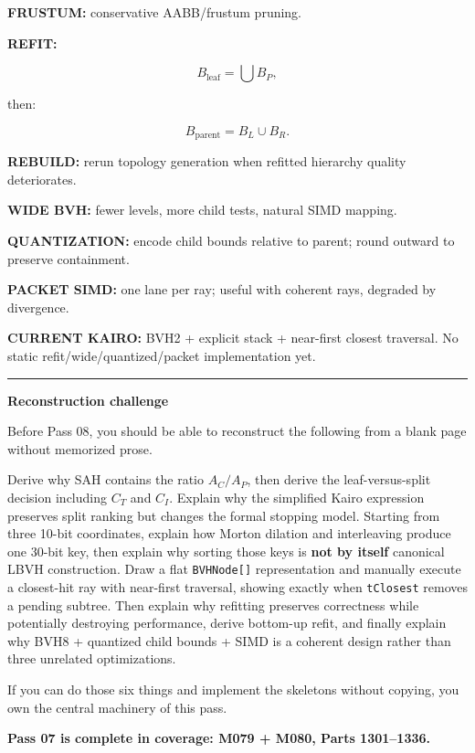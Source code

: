 \textbf{FRUSTUM:} conservative AABB/frustum pruning.

\textbf{REFIT:}

\[
B_{\text{leaf}}
=
\bigcup B_P,
\]

then:

\[
B_{\text{parent}}
=
B_L\cup B_R.
\]

\textbf{REBUILD:} rerun topology generation when refitted hierarchy quality deteriorates.

\textbf{WIDE BVH:} fewer levels, more child tests, natural SIMD mapping.

\textbf{QUANTIZATION:} encode child bounds relative to parent; round outward to preserve containment.

\textbf{PACKET SIMD:} one lane per ray; useful with coherent rays, degraded by divergence.

\textbf{CURRENT KAIRO:} BVH2 + explicit stack + near-first closest traversal. No static refit/wide/quantized/packet implementation yet.

\begin{center}\rule{0.5\linewidth}{0.5pt}\end{center}

\textbf{Reconstruction challenge}

Before Pass 08, you should be able to reconstruct the following from a blank page without memorized prose.

Derive why SAH contains the ratio \(A_C/A_P\), then derive the leaf-versus-split decision including \(C_T\) and \(C_I\). Explain why the simplified Kairo expression preserves split ranking but changes the formal stopping model. Starting from three 10-bit coordinates, explain how Morton dilation and interleaving produce one 30-bit key, then explain why sorting those keys is \textbf{not by itself} canonical LBVH construction. Draw a flat \texttt{BVHNode{[}{]}} representation and manually execute a closest-hit ray with near-first traversal, showing exactly when \texttt{tClosest} removes a pending subtree. Then explain why refitting preserves correctness while potentially destroying performance, derive bottom-up refit, and finally explain why BVH8 + quantized child bounds + SIMD is a coherent design rather than three unrelated optimizations.

If you can do those six things and implement the skeletons without copying, you own the central machinery of this pass.

\textbf{Pass 07 is complete in coverage: M079 + M080, Parts 1301--1336.}

